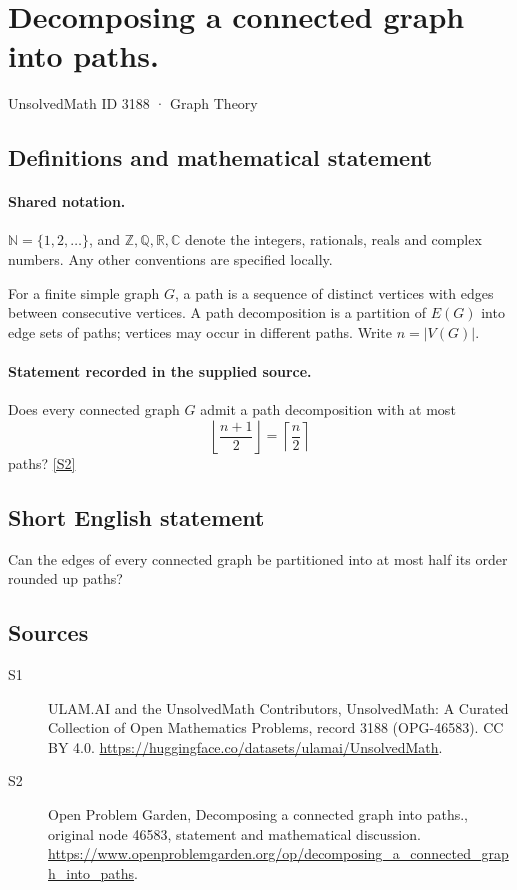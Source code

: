 \documentclass[11pt]{article}
\newcommand{\sref}[2]{\hyperlink{source:#1:#2}{[S#2]}}
\begin{document}
\setcounter{section}{3187}
\section{Decomposing a connected graph into paths.}\label{3188}
{\small\sffamily UnsolvedMath ID 3188 · Graph Theory}
\subsection{Definitions and mathematical statement}

\paragraph{Shared notation.}$\mathbb N=\{1,2,\ldots\}$, and $\mathbb Z,\mathbb Q,\mathbb R,\mathbb C$ denote the integers, rationals, reals and complex numbers. Any other conventions are specified locally.


For a finite simple graph $G$, a path is a sequence of distinct vertices with edges between consecutive vertices. A path decomposition is a partition of $E(G)$ into edge sets of paths; vertices may occur in different paths. Write $n=|V(G)|$.
\paragraph{Statement recorded in the supplied source.}
Does every connected graph $G$ admit a path decomposition with at most \[\left\lfloor\frac{n+1}{2}\right\rfloor=\left\lceil\frac n2\right\rceil\] paths? \sref{3188}{2}
\subsection{Short English statement}
Can the edges of every connected graph be partitioned into at most half its order rounded up paths?
\subsection{Sources}
\begin{description}
\item[\hypertarget{source:3188:1}{S1}] ULAM.AI and the UnsolvedMath Contributors, UnsolvedMath: A Curated Collection of Open Mathematics Problems, record 3188 (OPG-46583). CC BY 4.0. \url{https://huggingface.co/datasets/ulamai/UnsolvedMath}.
\item[\hypertarget{source:3188:2}{S2}] Open Problem Garden, Decomposing a connected graph into paths., original node 46583, statement and mathematical discussion. \url{https://www.openproblemgarden.org/op/decomposing_a_connected_graph_into_paths}.
\end{description}
\label{end:3188}
\end{document}
